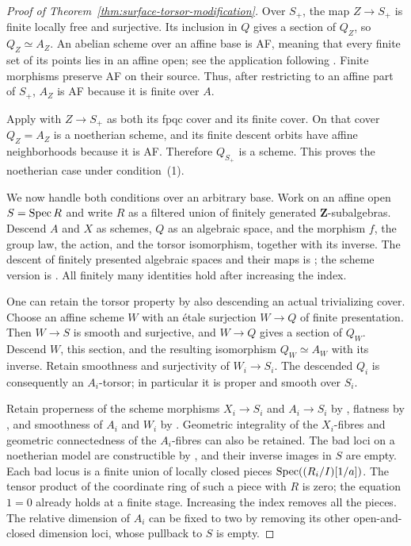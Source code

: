 \begin{proof}[Proof of Theorem~\ref{thm:surface-torsor-modification}]
Over $S_+$, the map $Z\to S_+$ is finite locally free and surjective.
Its inclusion in $Q$ gives a section of $Q_Z$, so $Q_Z\simeq A_Z$.
An abelian scheme over an affine base is AF, meaning that every finite
set of its points lies in an affine open; see the application following
\cite[Corollary~3.8, p.~5-15]{RaynaudDescent}. Finite morphisms preserve AF on
their source. Thus, after restricting to an affine part of $S_+$,
$A_Z$ is AF because it is finite over $A$.

Apply \cite[Theorem~4.2, pp.~5-16--5-18]{RaynaudDescent} with
$Z\to S_+$ as both its fpqc cover and its finite cover. On that cover
$Q_Z=A_Z$ is a noetherian scheme, and its finite descent orbits have
affine neighborhoods because it is AF. Therefore $Q_{S_+}$ is a
scheme. This proves the noetherian case under condition~(1).

We now handle both conditions over an arbitrary base. Work on an
affine open $S=\operatorname{Spec} R$ and write $R$ as a filtered union of finitely
generated $\mathbf Z$-subalgebras. Descend $A$ and $X$ as schemes,
$Q$ as an algebraic space, and the morphism $f$, the group law,
the action, and the torsor isomorphism, together with its inverse.
The descent of finitely presented algebraic spaces and their maps
is \cite[Tag~07SK]{Stacks}; the scheme version is
\cite[IV$_3$, 8.8--8.10]{EGA}. All finitely many identities hold
after increasing the index.

One can retain the torsor property by also descending an actual
trivializing cover. Choose an affine scheme $W$ with an \textup{\'etale}
surjection $W\to Q$ of finite presentation. Then $W\to S$ is smooth
and surjective, and $W\to Q$ gives a section of $Q_W$. Descend $W$,
this section, and the resulting isomorphism $Q_W\simeq A_W$ with
its inverse. Retain smoothness and surjectivity of $W_i\to S_i$.
The descended $Q_i$ is consequently an $A_i$-torsor; in particular
it is proper and smooth over $S_i$.

Retain properness of the scheme morphisms $X_i\to S_i$ and
$A_i\to S_i$ by \cite[IV$_3$, 8.10.5]{EGA}, flatness by
\cite[IV$_3$, 11.2.6(ii)]{EGA}, and smoothness of $A_i$ and $W_i$
by \cite[IV$_4$, 17.7.8(ii)]{EGA}. Geometric integrality of the
$X_i$-fibres and geometric connectedness of the $A_i$-fibres can
also be retained. The bad loci on a noetherian model are constructible
by \cite[IV$_3$, 9.7.7]{EGA}, and their inverse images in $S$ are
empty. Each bad locus is a finite union of locally closed pieces
$\operatorname{Spec}((R_i/I)[1/a])$. The tensor product of the coordinate ring
of such a piece with $R$ is zero; the equation $1=0$ already holds
at a finite stage. Increasing the index removes all the pieces.
The relative dimension of $A_i$ can be fixed to two by removing its
other open-and-closed dimension loci, whose pullback to $S$ is empty.


\end{proof}
